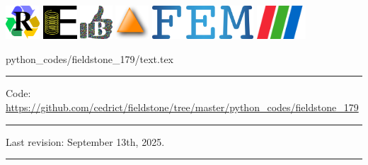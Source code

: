 \noindent
\includegraphics[height=1.25cm]{images/pictograms/replication}
\includegraphics[height=1.25cm]{images/pictograms/elasticity}
\includegraphics[height=1.25cm]{images/pictograms/benchmark}
\includegraphics[height=1.25cm]{images/pictograms/triangle}
\includegraphics[height=1.25cm]{images/pictograms/FEM}
\includegraphics[height=1.25cm]{images/pictograms/paraview}


\begin{flushright} {\tiny {\color{gray} python\_codes/fieldstone\_179/text.tex}} \end{flushright}

\par\noindent\rule{\textwidth}{0.4pt}

\begin{center}
\inpython
{\small Code: \url{https://github.com/cedrict/fieldstone/tree/master/python_codes/fieldstone_179}}
\end{center}

\par\noindent\rule{\textwidth}{0.4pt}

Last revision: September 13th, 2025.

\par\noindent\rule{\textwidth}{0.4pt}


